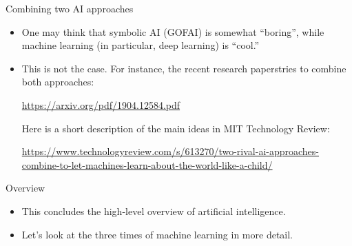 \documentclass{beamer}
\begin{document}
\begin{frame}{Combining two AI approaches}
\begin{itemize}
\item One may think that symbolic AI (GOFAI) is somewhat ``boring'', while machine learning (in particular, deep learning) is ``cool.''

\item This is not the case. For instance, the recent research paperstries to combine both approaches:

\medskip
\url{https://arxiv.org/pdf/1904.12584.pdf}

\medskip
Here is a short description of the main ideas in MIT  Technology Review:

{\tiny \url{https://www.technologyreview.com/s/613270/two-rival-ai-approaches-combine-to-let-machines-learn-about-the-world-like-a-child/}}
\end{itemize}
\end{frame}

\begin{frame}{Overview}
\begin{itemize}
\item This concludes the high-level overview of artificial intelligence.

\item Let's look at the three times of machine learning in more detail.
\end{itemize}
\end{frame}

%
%
%
\end{document}
